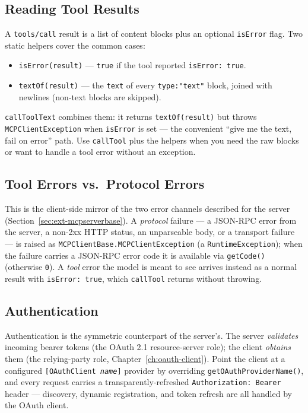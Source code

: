 \subsection{Reading Tool Results}

A \texttt{tools/call} result is a list of content blocks plus an optional \texttt{isError} flag.  Two static helpers cover the common cases:

\begin{itemize}
  \item \texttt{isError(result)} --- \texttt{true} if the tool reported \texttt{isError: true}.
  \item \texttt{textOf(result)} --- the \texttt{text} of every \texttt{type:"text"} block, joined with newlines (non-text blocks are skipped).
\end{itemize}

\noindent
\texttt{callToolText} combines them: it returns \texttt{textOf(result)} but throws \texttt{MCPClientException} when \texttt{isError} is set --- the convenient ``give me the text, fail on error'' path.  Use \texttt{callTool} plus the helpers when you need the raw blocks or want to handle a tool error without an exception.

\subsection{Tool Errors vs.\ Protocol Errors}

This is the client-side mirror of the two error channels described for the server (Section~\ref{sec:ext-mcpserverbase}).  A \emph{protocol} failure --- a JSON-RPC error from the server, a non-2xx HTTP status, an unparseable body, or a transport failure --- is raised as \texttt{MCPClientBase.MCPClientException} (a \texttt{Runtime\-Exception}); when the failure carries a JSON-RPC error code it is available via \texttt{getCode()} (otherwise \texttt{0}).  A \emph{tool} error the model is meant to see arrives instead as a normal result with \texttt{isError: true}, which \texttt{callTool} returns without throwing.

\subsection{Authentication}

Authentication is the symmetric counterpart of the server's.  The server \emph{validates} incoming bearer tokens (the OAuth 2.1 resource-server role); the client \emph{obtains} them (the relying-party role, Chapter~\ref{ch:oauth-client}).  Point the client at a configured \texttt{[OAuthClient \emph{name}]} provider by overriding \texttt{getOAuthProviderName()}, and every request carries a transparently-refreshed \texttt{Authorization: Bearer} header --- discovery, dynamic registration, and token refresh are all handled by the OAuth client.

